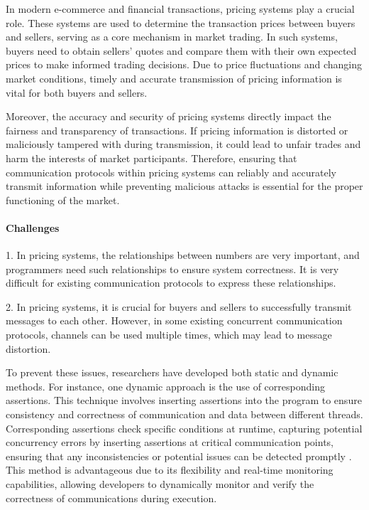\documentclass[master,english]{kuisthesis}
\begin{document}
In modern e-commerce and financial transactions, pricing systems play a crucial role. These systems are used to determine the transaction prices between buyers and sellers, serving as a core mechanism in market trading. In such systems, buyers need to obtain sellers' quotes and compare them with their own expected prices to make informed trading decisions. Due to price fluctuations and changing market conditions, timely and accurate transmission of pricing information is vital for both buyers and sellers.

Moreover, the accuracy and security of pricing systems directly impact the fairness and transparency of transactions. If pricing information is distorted or maliciously tampered with during transmission, it could lead to unfair trades and harm the interests of market participants. Therefore, ensuring that communication protocols within pricing systems can reliably and accurately transmit information while preventing malicious attacks is essential for the proper functioning of the market.



\paragraph{Challenges}

1. In pricing systems, the relationships between numbers are very important, and programmers need such relationships to ensure system correctness. It is very difficult for existing communication protocols to express these relationships.

2. In pricing systems, it is crucial for buyers and sellers to successfully transmit messages to each other. However, in some existing concurrent communication protocols, channels can be used multiple times, which may lead to message distortion.



To prevent these issues, researchers have developed both static and dynamic methods. For instance, one dynamic approach is the use of corresponding assertions. This technique involves inserting assertions into the program to ensure consistency and correctness of communication and data between different threads. Corresponding assertions check specific conditions at runtime, capturing potential concurrency errors by inserting assertions at critical communication points, ensuring that any inconsistencies or potential issues can be detected promptly \cite{?}. This method is advantageous due to its flexibility and real-time monitoring capabilities, allowing developers to dynamically monitor and verify the correctness of communications during execution.
\end{document}
